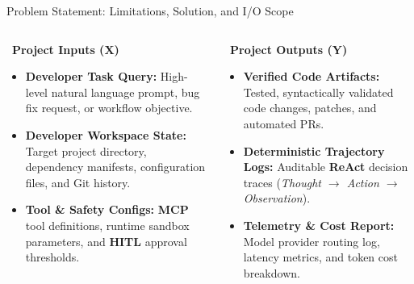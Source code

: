 \begin{frame}{Problem Statement: Limitations, Solution, and I/O Scope}
\vspace{0.12cm}

\begin{columns}[T]
    \begin{block}{\small\faTerminal\ \textbf{Project Inputs ($\mathbf{X}$)}}
        \scriptsize
        \begin{itemize}\setlength{\itemsep}{0.12em}\leftskip=-1em
            \item \textbf{Developer Task Query:} High-level natural language prompt, bug fix request, or workflow objective.
            \item \textbf{Developer Workspace State:} Target project directory, dependency manifests, configuration files, and Git history.
            \item \textbf{Tool \& Safety Configs:} \textbf{MCP} tool definitions, runtime sandbox parameters, and \textbf{HITL} approval thresholds.
        \end{itemize}
    \end{block}

    \begin{block}{\small\faFileCode\ \textbf{Project Outputs ($\mathbf{Y}$)}}
        \scriptsize
        \begin{itemize}\setlength{\itemsep}{0.12em}\leftskip=-1em
            \item \textbf{Verified Code Artifacts:} Tested, syntactically validated code changes, patches, and automated PRs.
            \item \textbf{Deterministic Trajectory Logs:} Auditable \textbf{ReAct} decision traces (\textit{Thought $\rightarrow$ Action $\rightarrow$ Observation}).
            \item \textbf{Telemetry \& Cost Report:} Model provider routing log, latency metrics, and token cost breakdown.
        \end{itemize}
    \end{block}
\end{columns}
\end{frame}
